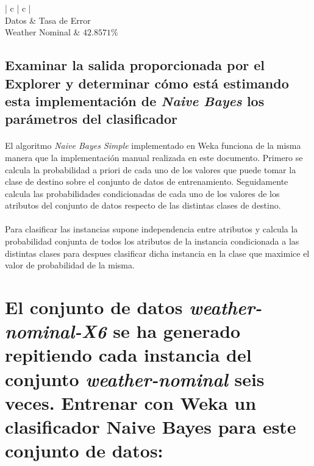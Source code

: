 \documentclass{article}
\begin{document}
			\begin{table}[H]
				\centering
				\begin{tabu}{ | c | c | }
					\hline
					 \\ \hline
					Datos	& Tasa de Error \\ \hline
					Weather Nominal	& $42.8571\%$	\\
					\hline
				\end{tabu}
				\caption{Validación Cruzada de 10 particiones con Naive Bayes}
				\label{table:e5}
			\end{table}

		\subsection{Examinar la salida proporcionada por el Explorer y determinar cómo está estimando esta implementación de \emph{Naive Bayes} los parámetros del clasificador}

			\paragraph{}
			El algoritmo \emph{Naive Bayes Simple} implementado en Weka funciona de la misma manera que la implementación manual realizada en este documento. Primero se calcula la probabilidad a priori de cada uno de los valores que puede tomar la clase de destino sobre el conjunto de datos de entrenamiento. Seguidamente calcula las probabilidades condicionadas de cada uno de los valores de los atributos del conjunto de datos respecto de las distintas clases de destino.

			\paragraph{}
			Para clasificar las instancias supone independencia entre atributos y calcula la probabilidad conjunta de todos los atributos de la instancia condicionada a las distintas clases para despues clasificar dicha instancia en la clase que maximice el valor de probabilidad de la misma.

	\section{El conjunto de datos \emph{weather-nominal-X6} se ha generado repitiendo cada instancia del conjunto \emph{weather-nominal} seis veces. Entrenar con Weka un clasificador Naive Bayes para este conjunto de datos:}
	\label{sec:e6}
\end{document}
